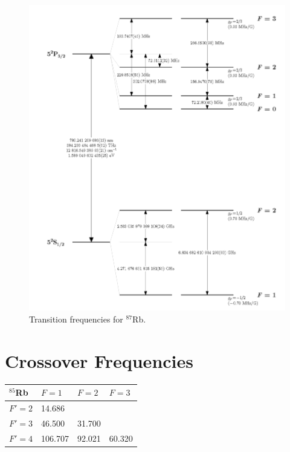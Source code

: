 \documentclass{article}
\begin{document}
\begin{appendices}
\begin{figure}[h]
    \centering
    \includegraphics{Figures/4/rubidium87numbers.png}
    \caption{Transition frequencies for $^{87}$Rb. \cite{asteck_alkali}}
    \label{fig:transition_frequencies_Rb87}
\end{figure}

\pagebreak{}

\section{Crossover Frequencies
\label{app:crossover_frequencies}}

\begin{table}[h]
    \centering
    \begin{tabular}{|l|l|l|l|}
    \hline
    $^{85}$Rb & $F = 1$ & $F = 2$ & $F = 3$ \\ \hline
    $F' = 2$  & 14.686  &         &         \\ \hline
    $F' = 3$  & 46.500  & 31.700  &         \\ \hline
    $F' = 4$  & 106.707 & 92.021  & 60.320  \\ \hline
    \end{tabular}
    \label{tab:crossover_frequencies_Rb85}
\end{table}


\end{appendices}
\end{document}
